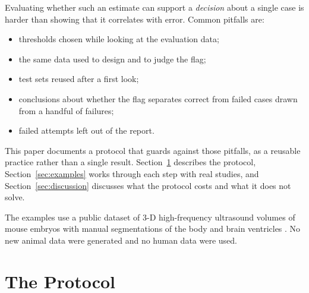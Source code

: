 \documentclass[journal,twoside]{IEEEtran}
\begin{document}
Evaluating whether
such an estimate can support a \emph{decision} about a single case is harder than showing that it correlates with
error. Common pitfalls are:
\begin{itemize}
\item thresholds chosen while looking at the evaluation data;
\item the same data used to design and to judge the flag;
\item test sets reused after a first look;
\item conclusions about whether the flag separates correct from failed cases drawn from a handful of failures;
\item failed attempts left out of the report.
\end{itemize}

This paper documents a protocol that guards against those pitfalls, as a reusable practice rather than a single
result. Section~\ref{sec:protocol} describes the protocol, Section~\ref{sec:examples} works through each step with
real studies, and Section~\ref{sec:discussion} discusses what the protocol costs and what it does not solve.

The examples use a public dataset of 3-D high-frequency ultrasound volumes of mouse embryos with manual
segmentations of the body and brain ventricles \cite{qiu2021,dataport,xu2020}. No new animal data were generated and
no human data were used.

\section{The Protocol}\label{sec:protocol}
\end{document}
